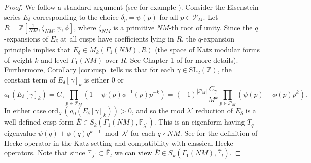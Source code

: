 \documentclass{amsart}
\theoremstyle{plain}
\theoremstyle{definition}
\begin{document}
\begin{proof}
We follow a standard argument (see for example \cite[Theorem 3.0.1]{spencer_2018}). Consider the Eisenstein series $E_{\underline{\delta}}$ corresponding to the choice $\delta_p=\psi(p)$ for all $p \in \mathcal{P}_M$. Let $R = \mathbb{Z}[\frac{1}{NM},\zeta_{NM}, \psi, \phi]$, where $\zeta_{NM}$ is a primitive $NM$-th root of unity. Since the $q$-expansions of $E_{\underline{\delta}}$ at all cusps have coefficients lying in $R$, the $q$-expansion principle \cite[Corollary 1.6.2]{katz_1973} implies that $E_{\underline{\delta}} \in M_k(\Gamma_1(NM), R)$ (the space of Katz modular forms of weight $k$ and level $\Gamma_1(NM)$ over $R$. See Chapter 1 of \cite{katz_1973} for more details).  Furthermore, Corollary \ref{cor:cusp} tells us that for each $\gamma\in\text{SL}_2(\mathbb{Z})$, the constant term of $E_{\underline{\delta}}[\gamma]_k$ is either $0$ or
\begin{equation*}
   a_0(E_{\underline{\delta}}[\gamma]_k) = C_{\gamma} \prod_{p \in \mathcal{P}_M} (1 - \psi(p) \phi^{-1}(p)p^{-k}) = (-1)^{|\mathcal{P}_M|}\frac{C_{\gamma}}{M^k}\prod_{p\in\mathcal{P}_M}(\psi(p)-\phi(p)p^k).
\end{equation*}
In either case $\text{ord}_{\lambda'}(a_0(E_{\underline{\delta}}[\gamma]_k)) > 0$, and so the mod $\lambda'$ reduction of $E_{\underline{\delta}}$ is a well defined cusp form $\overline{E} \in S_k(\Gamma_1(NM), \mathbb{F}_{\lambda^\prime})$. This is an eigenform having $T_q$ eigenvalue $\psi(q)+\phi(q)q^{k-1} \bmod \lambda'$ for each $q \nmid NM$. See \cite[Section 1.11]{katz_1973} for the definition of Hecke operator in the Katz setting and compatibility with classical Hecke operators. Note that since $\mathbb{F}_{\lambda^\prime} \subset \overline{\mathbb{F}}_l$ we can view $\overline{E} \in S_k(\Gamma_1(NM), \overline{\mathbb{F}}_l)$.


\end{proof}
\end{document}
